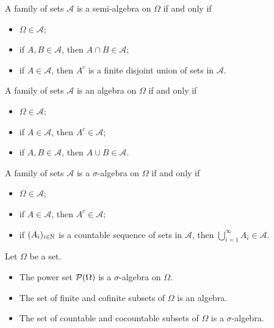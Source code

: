 \begin{lemma} \label{setAlgebraCriteria}
A family of sets $\mathcal{A}$ is a semi-algebra on $\Omega$ \textup{if and only if}
\begin{itemize}
\item $\Omega\in\mathcal{A}$;
\item if $A,B\in \mathcal{A}$, then $A\cap B\in \mathcal{A}$;
\item if $A\in \mathcal{A}$, then $A^c$ is a finite disjoint union of sets in $\mathcal{A}$.
\end{itemize}
A family of sets $\mathcal{A}$ is an algebra on $\Omega$ \textup{if and only if}
\begin{itemize}
\item $\Omega\in\mathcal{A}$;
\item if $A\in \mathcal{A}$, then $A^c\in \mathcal{A}$;
\item if $A,B\in \mathcal{A}$, then $A\cup B\in \mathcal{A}$.
\end{itemize}
A family of sets $\mathcal{A}$ is a $\sigma$-algebra on $\Omega$ \textup{if and only if}
\begin{itemize}
\item $\Omega\in\mathcal{A}$;
\item if $A\in \mathcal{A}$, then $A^c\in \mathcal{A}$;
\item if $(A_i)_{i\in\mathbb{N}}$ is a countable sequence of sets in $\mathcal{A}$, then $\bigcup_{i=1}^\infty A_i\in \mathcal{A}$.
\end{itemize}
\end{lemma}

\begin{example}
Let $\Omega$ be a set.
\begin{itemize}
    \item The power set $\operatorname{\mathcal{P}}(\Omega)$ is a $\sigma$-algebra on $\Omega$.
    \item The set of finite and cofinite subsets of $\Omega$ is an algebra.
    \item The set of countable and cocountable subsets of $\Omega$ is a $\sigma$-algebra.
\end{itemize}
\end{example}

